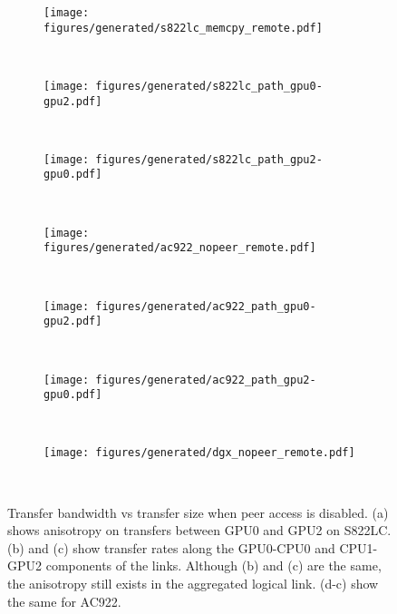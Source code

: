 \begin{figure}[ht]
	\centering
	\begin{subfigure}[b]{0.3\textwidth}
		\texttt{[image: figures/generated/s822lc\_memcpy\_remote.pdf]}
		\caption{}
		\label{fig:minsky-explicit-nopeer-remote}
	\end{subfigure}
	~
	\begin{subfigure}[b]{0.3\textwidth}
		\texttt{[image: figures/generated/s822lc\_path\_gpu0-gpu2.pdf]}
		\caption{}
		\label{fig:minsky-explicit-path-gpu0-gpu2}
	\end{subfigure}
	~
	\begin{subfigure}[b]{0.3\textwidth}
		\texttt{[image: figures/generated/s822lc\_path\_gpu2-gpu0.pdf]}
		\caption{}
		\label{fig:minsky-explicit-path-gpu2-gpu0}
	\end{subfigure}
	\\
	\begin{subfigure}[b]{0.3\textwidth}
		\texttt{[image: figures/generated/ac922\_nopeer\_remote.pdf]}
		\caption{}
		\label{fig:explicit-ac922-nopeer-remote}
	\end{subfigure}
	~
	\begin{subfigure}[b]{0.3\textwidth}
		\texttt{[image: figures/generated/ac922\_path\_gpu0-gpu2.pdf]}
		\caption{}
		\label{fig:ac922-explicit-path-gpu0-gpu2}
	\end{subfigure}
	~
	\begin{subfigure}[b]{0.3\textwidth}
		\texttt{[image: figures/generated/ac922\_path\_gpu2-gpu0.pdf]}
		\caption{}
		\label{fig:ac922-explicit-path-gpu2-gpu0}
	\end{subfigure}
	\\
	\begin{subfigure}[b]{0.3\textwidth}
		\texttt{[image: figures/generated/dgx\_nopeer\_remote.pdf]}
		\caption{}
		\label{fig:explicit-dgx-nopeer-remote}
	\end{subfigure}
	~
	\caption[Peer Access and GPU-GPU Transfer Bandwidth]{
		Transfer bandwidth vs transfer size when peer access is disabled.
		(a) shows anisotropy on transfers between GPU0 and GPU2 on S822LC.
		(b) and (c) show transfer rates along the GPU0-CPU0 and CPU1-GPU2 components of the links.
		Although (b) and (c) are the same, the anisotropy still exists in the aggregated logical link.
		(d-c) show the same for AC922.
	}
	\label{fig:explicit-peer-anisotropy}
\end{figure}

